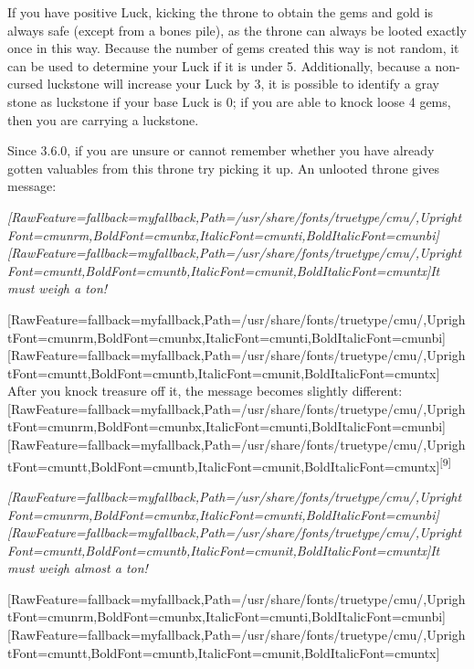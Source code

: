 If you have positive Luck, kicking the throne to obtain the gems and gold is always safe (except from a bones pile), as the throne can always be looted exactly once in this way. Because the number of gems created this way is not random, it can be used to determine your Luck if it is under 5. Additionally, because a non-{}cursed luckstone\footnotemark[127] will increase your Luck by 3, it is possible to identify a gray stone as luckstone if your base Luck is 0; if you are able to knock loose 4 gems, then you are carrying a luckstone.


Since 3.6.0, if you are unsure or cannot remember whether you have already gotten valuables from this throne try picking it up. An unlooted throne gives message:




\begin{myitemize}\item{}{\itshape \allowbreak{}\setmainfont{cmunti.ttf}[RawFeature={fallback=myfallback},Path=/usr/share/fonts/truetype/cmu/,UprightFont=cmunrm,BoldFont=cmunbx,ItalicFont=cmunti,BoldItalicFont=cmunbi]\setmonofont{cmunti.ttf}[RawFeature={fallback=myfallback},Path=/usr/share/fonts/truetype/cmu/,UprightFont=cmuntt,BoldFont=cmuntb,ItalicFont=cmunit,BoldItalicFont=cmuntx]\itshape {}It must weigh a ton!}
\end{myitemize}
\allowbreak{}\setmainfont{cmunrm.ttf}[RawFeature={fallback=myfallback},Path=/usr/share/fonts/truetype/cmu/,UprightFont=cmunrm,BoldFont=cmunbx,ItalicFont=cmunti,BoldItalicFont=cmunbi]\setmonofont{cmunrm.ttf}[RawFeature={fallback=myfallback},Path=/usr/share/fonts/truetype/cmu/,UprightFont=cmuntt,BoldFont=cmuntb,ItalicFont=cmunit,BoldItalicFont=cmuntx]
After you knock treasure off it, the message becomes slightly different:\allowbreak{}\setmainfont{cmunrm.ttf}[RawFeature={fallback=myfallback},Path=/usr/share/fonts/truetype/cmu/,UprightFont=cmunrm,BoldFont=cmunbx,ItalicFont=cmunti,BoldItalicFont=cmunbi]\setmonofont{cmunrm.ttf}[RawFeature={fallback=myfallback},Path=/usr/share/fonts/truetype/cmu/,UprightFont=cmuntt,BoldFont=cmuntb,ItalicFont=cmunit,BoldItalicFont=cmuntx]\textsuperscript{{$\text{[}$}9{$\text{]}$}}




\begin{myitemize}\item{}{\itshape \allowbreak{}\setmainfont{cmunti.ttf}[RawFeature={fallback=myfallback},Path=/usr/share/fonts/truetype/cmu/,UprightFont=cmunrm,BoldFont=cmunbx,ItalicFont=cmunti,BoldItalicFont=cmunbi]\setmonofont{cmunti.ttf}[RawFeature={fallback=myfallback},Path=/usr/share/fonts/truetype/cmu/,UprightFont=cmuntt,BoldFont=cmuntb,ItalicFont=cmunit,BoldItalicFont=cmuntx]\itshape {}It must weigh almost a ton!}
\end{myitemize}
\allowbreak{}\setmainfont{cmunrm.ttf}[RawFeature={fallback=myfallback},Path=/usr/share/fonts/truetype/cmu/,UprightFont=cmunrm,BoldFont=cmunbx,ItalicFont=cmunti,BoldItalicFont=cmunbi]\setmonofont{cmunrm.ttf}[RawFeature={fallback=myfallback},Path=/usr/share/fonts/truetype/cmu/,UprightFont=cmuntt,BoldFont=cmuntb,ItalicFont=cmunit,BoldItalicFont=cmuntx]

